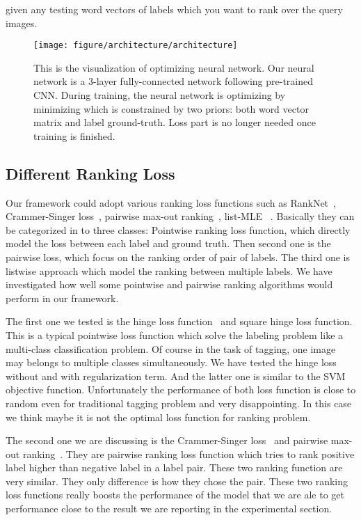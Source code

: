 \documentclass[10pt,twocolumn,letterpaper]{article}
\begin{document}
{ 

given any testing word vectors  of labels which you want to rank over the query images.

\begin{figure}
\centering
\texttt{[image: figure/architecture/architecture]}
\caption{This is the visualization of optimizing neural network. Our neural network is a 3-layer fully-connected network following pre-trained CNN. During training, the neural network is optimizing by minimizing  which is constrained by two priors: both word vector matrix and label ground-truth. Loss part is no longer needed once training is finished.}
\label{fig:optimization}
\end{figure}

\subsection{Different Ranking Loss}

Our framework could adopt various ranking loss functions such as RankNet~\cite{burges_learning_2005}, Crammer-Singer loss~\cite{crammer_algorithmic_2002}, pairwise max-out ranking~\cite{joachims_optimizing_2002}, list-MLE~\cite{xia_listwise_2008} \etc. Basically they can be categorized in to three classes: Pointwise ranking loss function, which directly model the loss between each label and ground truth. Then second one is the pairwise loss, which focus on the ranking order of pair of labels. The third one is listwise approach which model the ranking between multiple labels. We have investigated how well some pointwise and pairwise ranking algorithms would perform in our framework.

The first one we tested is the hinge loss function~\cite{cortes_support-vector_1995} and square hinge loss function. This is a typical pointwise loss function which solve the labeling problem like a multi-class classification problem. Of course in the task of tagging, one image may belongs to multiple classes simultaneously. We have tested the hinge loss without and with  regularization term. And the latter one is similar to the SVM objective function. Unfortunately the performance of both loss function is close to random even for traditional tagging problem and very disappointing. In this case we think maybe it is not the optimal loss function for ranking problem.

The second one we are discussing is the Crammer-Singer loss~\cite{crammer_algorithmic_2002} and pairwise max-out ranking~\cite{joachims_optimizing_2002}. They are pairwise ranking loss function which tries to rank positive label higher than negative label in a label pair. These two ranking function are very similar. They only difference is how they chose the pair. These two ranking loss functions really boosts the performance of the model that we are ale to get performance close to the result we are reporting in the experimental section. 

}
\end{document}
